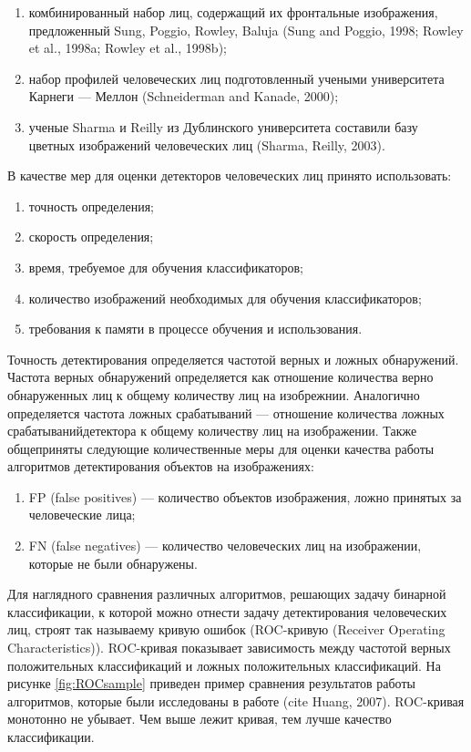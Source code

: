 \begin{enumerate}
	\item комбинированный набор лиц, содержащий их фронтальные изображения, предложенный Sung, Poggio, Rowley, Baluja (Sung and Poggio, 1998; Rowley et al., 1998a; Rowley et al., 1998b);
	\item набор профилей человеческих лиц подготовленный учеными университета Карнеги — Меллон (Schneiderman and Kanade, 2000);
	\item ученые Sharma и Reilly из Дублинского университета  составили базу цветных изображений человеческих лиц (Sharma, Reilly, 2003).
\end{enumerate}

В качестве мер для оценки детекторов человеческих лиц принято использовать:
\begin{enumerate}
	\item точность определения;
	\item скорость определения;
	\item время, требуемое для обучения классификаторов;
	\item количество изображений необходимых для обучения классификаторов;
	\item требования к памяти в процессе обучения и использования.
\end{enumerate}

Точность детектирования определяется частотой верных и ложных обнаружений. Частота верных обнаружений определяется как отношение количества верно обнаруженных лиц к общему количеству лиц на изобрежнии. Аналогично определяется частота ложных срабатываний --- отношение количества ложных срабатыванийдетектора к общему количеству лиц на изображении. Также общеприняты следующие количественные меры для оценки качества работы алгоритмов детектирования объектов на изображениях:

\begin{enumerate}
	\item FP (false positives) --- количество объектов изображения, ложно принятых за человеческие лица;
	\item FN (false negatives) --- количество человеческих лиц на изображении, которые не были обнаружены. 
\end{enumerate}

Для наглядного сравнения различных алгоритмов, решающих задачу бинарной классификации, к которой можно отнести задачу детектирования человеческих лиц, строят так называему кривую ошибок (ROC-кривую (Receiver Operating Characteristics)). ROC-кривая показывает зависимость между частотой верных положительных классификаций и ложных положительных классификаций. На рисунке \ref{fig:ROCsample} приведен пример сравнения результатов работы алгоритмов, которые были исследованы в работе (cite Huang, 2007). ROC-кривая монотонно не убывает. Чем выше лежит кривая, тем лучше качество классификации.

